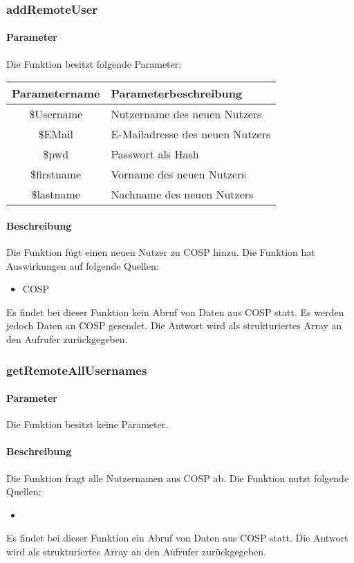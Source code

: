 \subsubsection{addRemoteUser}
\paragraph{Parameter} Die Funktion besitzt folgende Parameter:
\begin{table}[H]
	\begin{tabular}{|c|p{11cm}|}
		\hline
		\textbf{Parametername} & \textbf{Parameterbeschreibung} \\ \hline
		\$Username  & Nutzername des neuen Nutzers\\ \hline
		\$EMail     & E-Mailadresse des neuen Nutzers \\ \hline
		\$pwd       & Passwort als Hash \\ \hline
		\$firstname & Vorname des neuen Nutzers \\ \hline
		\$lastname  & Nachname des neuen Nutzers \\ \hline
	\end{tabular}
\end{table}
\paragraph{Beschreibung} Die Funktion fügt einen neuen Nutzer zu {\glqq COSP\grqq} hinzu. Die Funktion hat Auswirkungen auf folgende Quellen:
\begin{itemize}
	\item COSP
\end{itemize}
Es findet bei dieser Funktion kein Abruf von Daten aus {\glqq COSP\grqq} statt. Es werden jedoch Daten an {\glqq COSP\grqq} gesendet. Die Antwort wird als strukturiertes Array an den Aufrufer zurückgegeben.
\subsubsection{getRemoteAllUsernames}
\paragraph{Parameter} Die Funktion besitzt keine Parameter.
\paragraph{Beschreibung} Die Funktion fragt alle Nutzernamen aus {\glqq COSP\grqq} ab. Die Funktion nutzt folgende Quellen:
\begin{itemize}
	\item 
\end{itemize}
Es findet bei dieser Funktion ein Abruf von Daten aus {\glqq COSP\grqq} statt. Die Antwort wird als strukturiertes Array an den Aufrufer zurückgegeben.
